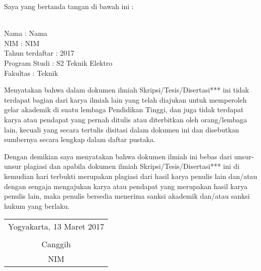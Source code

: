 \noindent Saya yang bertanda tangan di bawah ini :

\vspace{-1em}

\begin{tabbing}
\hspace{40mm} \= \\ %
\noindent Nama \> : Nama \\[\parskip]
\noindent NIM \> : NIM \\[\parskip]
\noindent Tahun terdaftar \> : 2017 \\[\parskip]
\noindent Program Studi \> : S2 Teknik Elektro \\[\parskip]
\noindent Fakultas \> : Teknik
\end{tabbing}

\noindent Menyatakan bahwa dalam dokumen ilmiah Skripsi/Tesis/Disertasi*** ini tidak terdapat bagian dari karya ilmiah lain yang telah diajukan untuk memperoleh gelar akademik di suatu lembaga Pendidikan Tinggi, dan juga tidak terdapat karya atau pendapat yang pernah ditulis atau diterbitkan oleh orang/lembaga lain, kecuali yang secara tertulis disitasi dalam dokumen ini dan disebutkan sumbernya secara lengkap dalam daftar pustaka.

\noindent Dengan demikian saya menyatakan bahwa dokumen ilmiah ini bebas dari unsur-unsur plagiasi dan apabila dokumen ilmiah Skripsi/Tesis/Disertasi*** ini di kemudian hari terbukti merupakan plagiasi dari hasil karya penulis lain dan/atau dengan sengaja mengajukan karya atau pendapat yang merupakan hasil karya penulis lain, maka penulis bersedia menerima sanksi akademik dan/atau sanksi hukum yang berlaku.


\begin{flushright}
	\begin{tabular}{c}
		Yogyakarta, 13 Maret 2017 \\
		\vspace{2.5cm} \\
		Canggih \\ NIM
	\end{tabular}
\end{flushright}